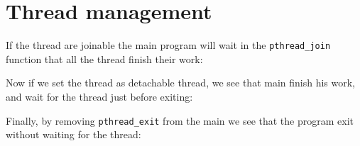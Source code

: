 \chapter{Thread management}

If the thread are joinable the main program will wait in the \verb+pthread_join+ function that all the thread finish their work:



Now if we set the thread as detachable thread, we see that main finish his work, and wait for the thread just before exiting:



Finally, by removing \verb+pthread_exit+ from the main we see that the program exit without waiting for the thread:


